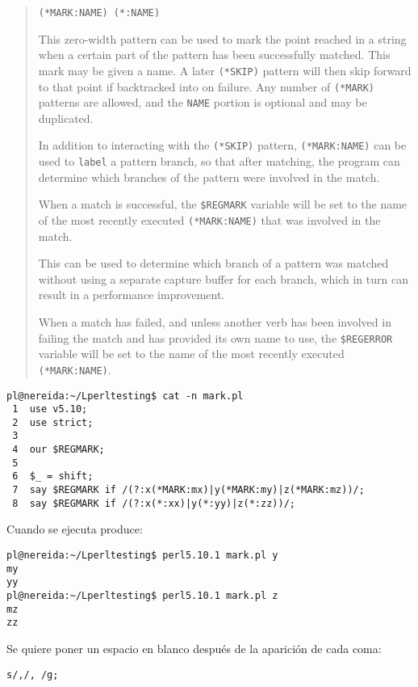 \begin{it}
\begin{quotation}
\verb|(*MARK:NAME) (*:NAME)|

This zero-width pattern can be used to mark the point reached in a string
when a certain part of the pattern has been successfully matched. This
mark may be given a name. A later \verb|(*SKIP)| pattern will then skip
forward to that point if backtracked into on failure. Any number of
\verb|(*MARK)| patterns are allowed, and the \verb|NAME| portion is optional and may
be duplicated.

In addition to interacting with the \verb|(*SKIP)| pattern, \verb|(*MARK:NAME)| can
be used to \verb"label" a pattern branch, so that after matching, the program
can determine which branches of the pattern were involved in the match.

When a match is successful, the \verb|$REGMARK| variable will be set to the name
of the most recently executed \verb|(*MARK:NAME)| that was involved in the match.

This can be used to determine which branch of a pattern was
matched without using a separate capture buffer for each branch,
which in turn can result in a performance improvement.

When a match has failed, and unless another verb has been involved in
failing the match and has provided its own name to use, the \verb|$REGERROR|
variable will be set to the name of the most recently executed
\verb|(*MARK:NAME)|.
\end{quotation}
\end{it}

\begin{verbatim}
pl@nereida:~/Lperltesting$ cat -n mark.pl
 1  use v5.10;
 2  use strict;
 3
 4  our $REGMARK;
 5
 6  $_ = shift;
 7  say $REGMARK if /(?:x(*MARK:mx)|y(*MARK:my)|z(*MARK:mz))/;
 8  say $REGMARK if /(?:x(*:xx)|y(*:yy)|z(*:zz))/;
\end{verbatim}
Cuando se ejecuta produce:
\begin{verbatim}
pl@nereida:~/Lperltesting$ perl5.10.1 mark.pl y
my
yy
pl@nereida:~/Lperltesting$ perl5.10.1 mark.pl z
mz
zz
\end{verbatim}


Se quiere poner un espacio en blanco después de la aparición de cada coma:

\begin{verbatim}
s/,/, /g;
\end{verbatim}

